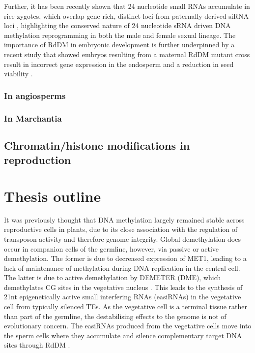 Further, it has been recently shown that 24 nucleotide small RNAs accumulate in rice zygotes, which overlap gene rich, distinct loci from paternally derived siRNA loci \citep{RN166}, highlighting the conserved nature of 24 nucleotide sRNA driven DNA methylation reprogramming in both the male and female sexual lineage. The importance of RdDM in embryonic development is further underpinned by a recent study that showed embryos resulting from a maternal RdDM mutant cross result in incorrect gene expression in the endosperm and a reduction in seed viability \citep{RN167}.



\subsubsection{In angiosperms}
\subsubsection{In Marchantia}
\subsection{Chromatin/histone modifications in reproduction}

\section{Thesis outline} %

It was previously thought that DNA methylation largely remained stable across reproductive cells in plants, due to its close association with the regulation of transposon activity \citep{RN247} and therefore genome integrity. Global demethylation does occur in companion cells of the germline, however, via passive or active demethylation. The former is due to decreased expression of MET1, leading to a lack of maintenance of methylation during DNA replication in the central cell. The latter is due to active demethylation by DEMETER (DME), which demethylates CG sites in the vegetative nucleus \citep{RN235,RN57}. This leads to the synthesis of 21nt epigenetically active small interfering RNAs (easiRNAs) in the vegetative cell from typically silenced TEs. As the vegetative cell is a terminal tissue rather than part of the germline, the destabilising effects to the genome is not of evolutionary concern. The easiRNAs produced from the vegetative cells move into the sperm cells where they accumulate and silence complementary target DNA sites through RdDM \citep{RN14,RN16}.

